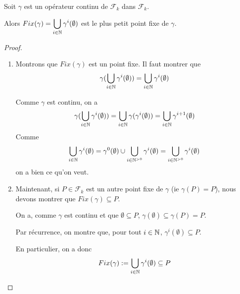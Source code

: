 \begin{theorem} 
	\label{theorem:plus_petit_point_fixe}
	Soit $\gamma$ est un opérateur continu de $\mathcal{F}_{k}$ dans
	$\mathcal{F}_{k}$.

	Alors $Fix(\gamma) = \displaystyle \bigcup_{i \in \mathbb{N}} \gamma^{i}(\emptyset)$ est le
	plus petit point fixe de $\gamma$.
\end{theorem}

\ifdefined\outputproof
\begin{proof}
	\begin{enumerate}
		\item Montrons que $Fix(\gamma)$ est un point fixe. Il faut montrer que
			\begin{equation}
				\gamma(\bigcup_{i \in \mathbb{N}} \gamma^{i}(\emptyset)) = \bigcup_{i \in
				\mathbb{N}} \gamma^{i}(\emptyset)
			\end{equation}

			Comme $\gamma$ est continu, on a
			\begin{equation}
				\gamma(\bigcup_{i \in \mathbb{N}} \gamma^{i}(\emptyset)) = \bigcup_{i \in
				\mathbb{N}} \gamma(\gamma^{i}(\emptyset)) = \bigcup_{i \in
				\mathbb{N}} \gamma^{i + 1}(\emptyset)
			\end{equation}
			Comme
			\begin{equation}
				\bigcup_{i \in \mathbb{N}} \gamma^{i}(\emptyset) = \gamma^{0}(\emptyset)
				\cup \bigcup_{i \in \mathbb{N}^{> 0}} \gamma^{i}(\emptyset) = \bigcup_{i
					\in \mathbb{N}^{> 0}} \gamma^{i}(\emptyset)
			\end{equation}
			on a bien ce qu'on veut.

		\item Maintenant, si $P \in \mathcal{F}_{k}$ est un autre point fixe de $\gamma$ (ie $\gamma(P) =
			P$), nous devons montrer que $Fix(\gamma) \subseteq P$.

			On a, comme $\gamma$ est continu et que $\emptyset \subseteq P$,
			$\gamma(\emptyset) \subseteq \gamma(P) = P$.

			Par récurrence, on montre que, pour tout $i \in \mathbb{N}$,
			$\gamma^{i}(\emptyset) \subseteq P$.

			En particulier, on a donc
			\begin{equation}
				Fix(\gamma) := \bigcup_{i \in \mathbb{N}} \gamma^{i}(\emptyset) \subseteq
				P
			\end{equation}
	\end{enumerate}
	\end{proof}
\fi

